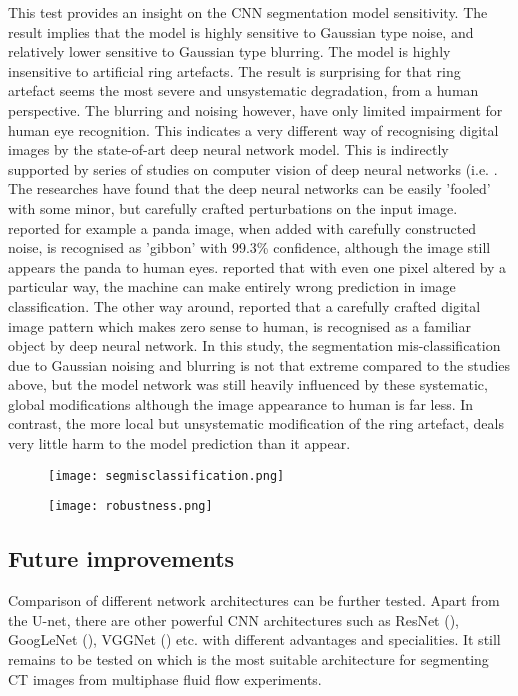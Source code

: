 \documentclass[draft,linenumbers]{agujournal2018}
\begin{document}
 This test provides an insight on the CNN segmentation model sensitivity. The result implies that the model is highly sensitive to Gaussian type noise, and relatively lower sensitive to Gaussian type blurring. The model is highly insensitive to artificial ring artefacts. The result is surprising for that ring artefact seems the most severe and unsystematic degradation, from a human perspective. The blurring and noising however, have only limited impairment for human eye recognition. This indicates a very different way of recognising digital images by the state-of-art deep neural network model. This is indirectly supported by series of studies on computer vision of deep neural networks (i.e. \citet{nguyen2015deep, goodfellow2014explaining,su2019one}. The researches have found that the deep neural networks can be easily 'fooled' with some minor, but carefully crafted perturbations on the input image. \citet{goodfellow2014explaining} reported for example a panda image, when added with carefully constructed noise, is recognised as 'gibbon' with 99.3\% confidence, although the image still appears the panda to human eyes. \citet{su2019one} reported that with even one pixel altered by a particular way, the machine can make entirely wrong prediction in image classification. The other way around, \citet{nguyen2015deep} reported that a carefully crafted digital image pattern which makes zero sense to human, is recognised as a familiar object by deep neural network. In this study, the segmentation mis-classification due to Gaussian noising and blurring is not that extreme compared to the studies above, but the model network was still heavily influenced by these systematic, global modifications although the image appearance to human is far less. In contrast, the more local but unsystematic modification of the ring artefact, deals very little harm to the model prediction than it appear.
 
\begin{figure}[h]
 \centering
 \texttt{[image: segmisclassification.png]}
 \caption{}
 \label{misclassification}
 \end{figure}
 
\begin{figure}[h]
 \centering
 \texttt{[image: robustness.png]}
 \caption{}
 \label{robustness}
 \end{figure}
 

\subsection{Future improvements}
Comparison of different network architectures can be further tested. Apart from the U-net, there are other powerful CNN architectures such as ResNet (\citet{he2016deep}), GoogLeNet (\citet{szegedy2015going}), VGGNet (\citet{simonyan2014very}) etc. with different advantages and specialities. It still remains to be tested on which is the most suitable architecture for segmenting \textmu CT images from multiphase fluid flow experiments.
\end{document}
